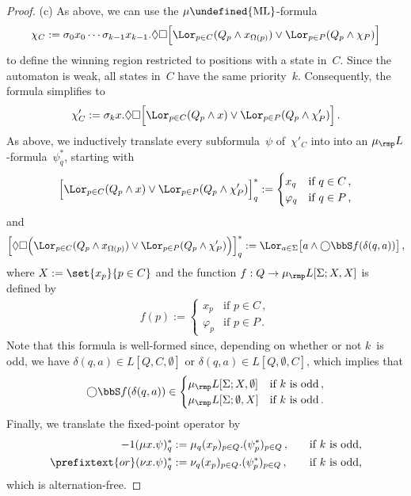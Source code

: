 \documentclass[10pt, fleqn]{scrartcl}
\makeatletter
\newcommand\m@thsm@ller[2]{\mbox{\relscale{0.91}$\m@th#1#2$}}
\let\smaller\undefined
\DeclareRobustCommand\smaller[1]{\relax\ifmmode{\mathpalette\m@thsm@ller{#1}}\else{\relscale{0.91}#1}\fi}
\newcommand*{\ML}{\smaller{\mathrm{ML}}}
\newcommand*{\mup}{\mu_\rmp}
\newcommand*{\?}{\kern .08em}
\newcommand\medcircle{\bigcirc}
\makeatother
\begin{document}
\begin{proof}
(c) As above, we can use the $\mu\ML$-formula
\begin{align*}
  \chi_C := \sigma_0x_0\cdots\sigma_{k-1}x_{k-1}.
               {\Diamond}{\Box}
                 \Bigl[\Lor_{p \in C}(Q_p \land x_{\Omega(p)}) \lor
                         \Lor_{p \in P} (Q_p \land \chi_P)\Bigr]
\end{align*}
to define the winning region restricted to positions with a state in~$C$.
Since the automaton is weak, all states in~$C$ have the same priority~$k$.
Consequently, the formula simplifies to
\begin{align*}
  \chi'_C := \sigma_kx.
               {\Diamond}{\Box}
                 \Bigl[\Lor_{p \in C}(Q_p \land x) \lor
                         \Lor_{p \in P} (Q_p \land \chi'_P)\Bigr]\,.
\end{align*}
As above, we inductively translate every subformula~$\psi$ of~$\chi'_C$ into
into an $\mup L$-formula~$\psi^*_q$, starting with
\begin{align*}
  \Bigl[\Lor_{p \in C}(Q_p \land x) \lor \Lor_{p \in P} (Q_p \land \chi'_P)\Bigr]^*_q
    := \begin{cases}
         x_q       &\text{if } q \in C\,, \\
         \varphi_q &\text{if } q \in P\,,
       \end{cases}
\end{align*}
and
\begin{align*}
  \Bigl[{\Diamond}{\Box}\Bigl(\Lor_{p \in C}(Q_p \land x_{\Omega(p)}) \lor
          \Lor_{p \in P} (Q_p \land \chi'_P)\Bigr)\Bigr]^*_q
    := \Lor_{a \in \Sigma}
         \bigl[a \land {\medcircle}\bbS f(\delta(q,a))\bigr]\,,
\end{align*}
where $X := \set{ x_p }{ p \in C }$ and the function $f : Q \to \mup L[\Sigma;X,X]$ is defined by
\begin{align*}
  f(p) := \begin{cases}
            x_p       &\text{if } p \in C\,, \\
            \varphi_p &\text{if } p \in P\,.
          \end{cases}
\end{align*}
Note that this formula is well-formed since, depending on whether or not $k$~is odd,
we have $\delta(q,a) \in L[Q,C,\emptyset]$ or $\delta(q,a) \in L[Q,\emptyset,C]$,
which implies that
\begin{align*}
  {\medcircle}\bbS f(\delta(q,a)) \in
    \begin{cases}
      \mup L[\Sigma;X,\emptyset] &\text{if $k$ is odd}\,, \\
      \mup L[\Sigma;\emptyset,X] &\text{if $k$ is odd}\,.
    \end{cases}
\end{align*}
Finally, we translate the fixed-point operator by
\begin{alignat*}{-1}
  (\mu x.\psi)^*_q &:= \mu_q (x_p)_{p \in Q}.(\psi^*_p)_{p \in Q}\,,
    &&\quad\text{if $k$ is odd,} \\
\prefixtext{or}
  (\nu x.\psi)^*_q &:= \nu_q (x_p)_{p \in Q}.(\psi^*_p)_{p \in Q}\,,
    &&\quad\text{if $k$ is odd,}
\end{alignat*}
which is alternation-free.
\end{proof}
\end{document}
